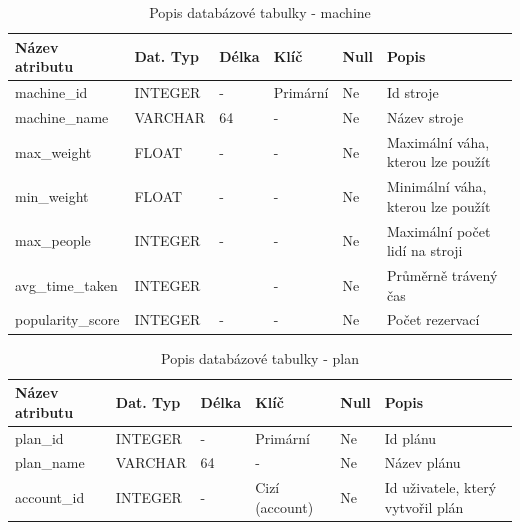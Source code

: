 \begin{table}[ht]
	\caption{Popis databázové tabulky - machine}
    \label{tab:dat-dictionary-machine}
	\begin{tabular}{|p{3.5cm}|p{2cm}|p{1cm}|p{2.5cm}|p{.75cm}|p{3.75cm}|}
		\hline
        \textbf{Název atributu} & \textbf{Dat. Typ} & \textbf{Délka} & \textbf{Klíč} & \textbf{Null} & \textbf{Popis} \\
        \hline
            machine\_id & INTEGER   &  -    & Primární       & Ne & Id stroje \\
            \hline
            machine\_name     & VARCHAR   &  64   & -                 & Ne & Název stroje \\
            \hline
            max\_weight       & FLOAT   &  -   & -                 & Ne &  Maximální váha, kterou lze použít \\
            \hline
            min\_weight       & FLOAT   &  -    & -                 & Ne &  Minimální váha, kterou lze použít \\
            \hline
            max\_people       & INTEGER   &  -  & -                 & Ne & Maximální počet lidí na stroji \\
            \hline
            avg\_time\_taken    & INTEGER   &     & -                 & Ne & Průměrně trávený čas \\
            \hline
            popularity\_score & INTEGER      &  -    & -                 & Ne &  Počet rezervací \\
        \hline
	\end{tabular}
\end{table}

\begin{table}[ht]
	\caption{Popis databázové tabulky - plan}
    \label{tab:dat-dictionary-plan}
	\begin{tabular}{|p{3.5cm}|p{2cm}|p{1cm}|p{2.5cm}|p{.75cm}|p{3.75cm}|}
		\hline
        \textbf{Název atributu} & \textbf{Dat. Typ} & \textbf{Délka} & \textbf{Klíč} & \textbf{Null} & \textbf{Popis} \\
        \hline
            plan\_id & INTEGER   &  -    & Primární       & Ne & Id plánu \\
        \hline
            plan\_name     & VARCHAR   &  64   & -                 & Ne & Název plánu \\
        \hline
            account\_id     & INTEGER   &  -   & Cizí (account)                 & Ne & Id uživatele, který vytvořil plán \\
        \hline
	\end{tabular}
\end{table}

